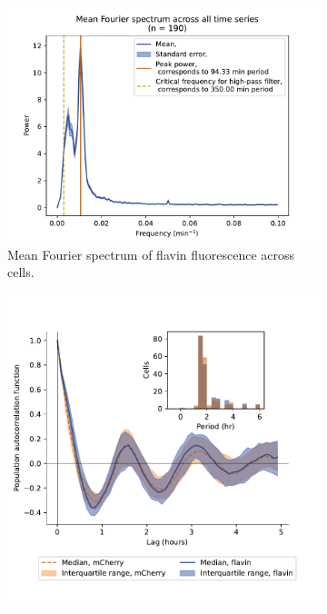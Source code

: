 \begin{figure}
  \centering
  \begin{subfigure}[htpb]{0.4\textwidth}
   \centering
   \includegraphics[width=\textwidth]{htb2mCherry_26643_14}
   \caption{
    Mean Fourier spectrum of flavin fluorescence across cells.%
   }
   \label{fig:biology-highglc-sync-fourier}
  \end{subfigure}%
  \begin{subfigure}[htpb]{0.4\textwidth}
   \centering
   \includegraphics[width=\textwidth]{htb2mCherry_26643_12}

\end{subfigure}
\end{figure}

